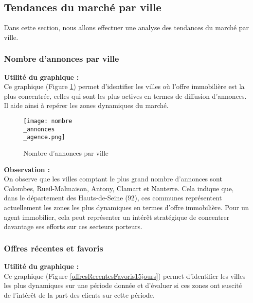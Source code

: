 \documentclass[a4paper, 12pt, twoside]{report}
\begin{document}
		\subsection{Tendances du marché par ville}

			Dans cette section, nous allons effectuer une analyse des tendances du marché par ville.

			\subsubsection{Nombre d’annonces par ville}

			{\bf Utilité du graphique :} \\

			Ce graphique (Figure \ref{nombreAnnoncesAgence}) permet d’identifier les villes où l’offre immobilière est la plus concentrée, celles qui sont les plus actives en termes de diffusion d’annonces. Il aide ainsi à repérer les zones dynamiques du marché. \\

			\begin{figure}[h]
				\centering
				\texttt{[image: nombre\\\_annonces\\\_agence.png]}
				\caption{Nombre d’annonces par ville}
				\label{nombreAnnoncesAgence}
			\end{figure}

			{\bf Observation :} \\

			On observe que les villes comptant le plus grand nombre d’annonces sont Colombes, Rueil-Malmaison, Antony, Clamart et Nanterre. Cela indique que, dans le département des Hauts-de-Seine (92), ces communes représentent actuellement les zones les plus dynamiques en termes d’offre immobilière. Pour un agent immobilier, cela peut représenter un intérêt stratégique de concentrer davantage ses efforts sur ces secteurs porteurs.

			\subsubsection{Offres récentes et favoris}

			{\bf Utilité du graphique :} \\

			Ce graphique (Figure \ref{offresRecentesFavoris15jours}) permet d’identifier les villes les plus dynamiques sur une période donnée et d’évaluer si ces zones ont suscité de l’intérêt de la part des clients sur cette période. \\
\end{document}
